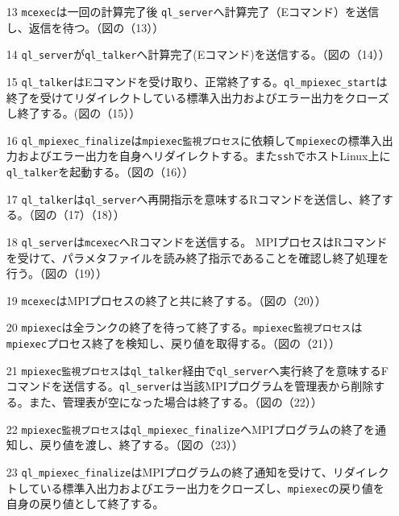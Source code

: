 \documentclass[twoside,11pt,fleqn]{book}
\begin{document}
\begin{itemize}
\item[13] \texttt{mcexec}は一回の計算完了後
\texttt{ql\_server}へ計算完了（Eコマンド）を送信し、返信を待つ。（図の（13））
\item[14] \texttt{ql\_server}が\texttt{ql\_talker}へ計算完了(Eコマンド)を送信する。（図の（14））
\item[15]  \texttt{ql\_talker}はEコマンドを受け取り、正常終了する。\texttt{ql\_mpiexec\_start}は終了を受けてリダイレクトしている標準入出力およびエラー出力をクローズし終了する。(図の（15））
\item[16] \texttt{ql\_mpiexec\_finalize}は\texttt{mpiexec監視プロセス}に依頼して\texttt{mpiexec}の標準入出力およびエラー出力を自身へリダイレクトする。また\texttt{ssh}でホストLinux上に\texttt{ql\_talker}を起動する。（図の（16））
\item[17] \texttt{ql\_talker}は\texttt{ql\_server}へ再開指示を意味するRコマンドを送信し、終了する。（図の（17）（18））
\item[18] \texttt{ql\_server}は\texttt{mcexec}へRコマンドを送信する。
MPIプロセスはRコマンドを受けて、パラメタファイルを読み終了指示であることを確認し終了処理を行う。（図の（19））
\item[19] \texttt{mcexec}はMPIプロセスの終了と共に終了する。（図の（20））
\item[20] \texttt{mpiexec}は全ランクの終了を待って終了する。\texttt{mpiexec監視プロセス}は\texttt{mpiexec}プロセス終了を検知し、戻り値を取得する。（図の（21））
\item[21] \texttt{mpiexec監視プロセス}は\texttt{ql\_talker}経由で\texttt{ql\_server}へ実行終了を意味するFコマンドを送信する。\texttt{ql\_server}は当該MPIプログラムを管理表から削除する。また、管理表が空になった場合は終了する。（図の（22））
\item[22] \texttt{mpiexec監視プロセス}は\texttt{ql\_mpiexec\_finalize}へMPIプログラムの終了を通知し、戻り値を渡し、終了する。（図の（23））
\item[23] \texttt{ql\_mpiexec\_finalize}はMPIプログラムの終了通知を受けて、リダイレクトしている標準入出力およびエラー出力をクローズし、\texttt{mpiexec}の戻り値を自身の戻り値として終了する。
\end{itemize}
\FloatBarrier

\subsection{}
\end{document}
